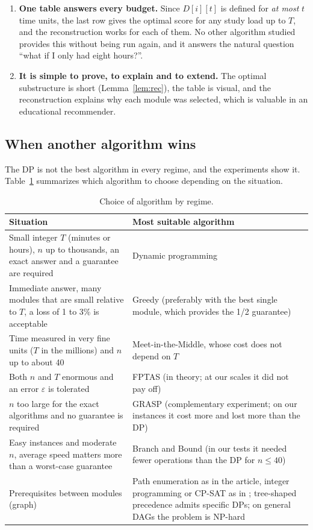 \begin{enumerate}[leftmargin=1.6em,itemsep=3pt]
\item \textbf{One table answers every budget.} Since $D[i][t]$ is defined for \emph{at most} $t$ time units, the last row gives the optimal score for any study load up to $T$, and the reconstruction works for each of them. No other algorithm studied provides this without being run again, and it answers the natural question ``what if I only had eight hours?''.
\item \textbf{It is simple to prove, to explain and to extend.} The optimal substructure is short (Lemma~\ref{lem:rec}), the table is visual, and the reconstruction explains why each module was selected, which is valuable in an educational recommender.
\end{enumerate}

\subsection{When another algorithm wins}

The DP is not the best algorithm in every regime, and the experiments show it. Table~\ref{tab:decision} summarizes which algorithm to choose depending on the situation.

\begin{table}[h]
\centering
\caption{Choice of algorithm by regime.}\label{tab:decision}
\small
\begin{tabularx}{\linewidth}{@{}X X@{}}
\toprule
Situation & Most suitable algorithm\\
\midrule
Small integer $T$ (minutes or hours), $n$ up to thousands, an exact answer and a guarantee are required & Dynamic programming\\
Immediate answer, many modules that are small relative to $T$, a loss of 1 to 3\% is acceptable & Greedy (preferably with the best single module, which provides the 1/2 guarantee)\\
Time measured in very fine units ($T$ in the millions) and $n$ up to about 40 & Meet-in-the-Middle, whose cost does not depend on $T$\\
Both $n$ and $T$ enormous and an error $\varepsilon$ is tolerated & FPTAS (in theory; at our scales it did not pay off)\\
$n$ too large for the exact algorithms and no guarantee is required & GRASP (complementary experiment; on our instances it cost more and lost more than the DP)\\
Easy instances and moderate $n$, average speed matters more than a worst-case guarantee & Branch and Bound (in our tests it needed fewer operations than the DP for $n\le40$)\\
Prerequisites between modules (graph) & Path enumeration as in the article, integer programming or CP-SAT as in \cite{bose2026learnopt}; tree-shaped precedence admits specific DPs; on general DAGs the problem is NP-hard \cite{samphaiboon2000}\\
\bottomrule
\end{tabularx}
\end{table}

